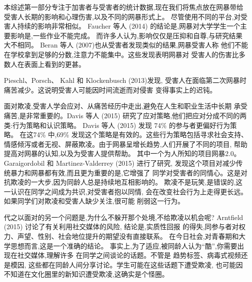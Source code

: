 \documentclass[a4paper]{article}
\begin{document}
本综述第一部分专注于加害者与受害者的统计数据,现在我们将焦点放在网暴带给
受害人长期的影响和心理伤害,以及不同的网暴形式上。
尽管使用不同的平台,对受害人持续的影响非常相似。 Faucher 等人 (2014)
\cite{faucher2014}
的结论是,网暴对大学学生一个主要影响是,一些作业不能完成。
而许多人认为,影响仅仅是压抑和自尊,与研究结果大不相同。
Beran 等人 (2007)\cite{beran2007}也从受害者发现类似的结果,网暴受害人称
他们不能在学校拿到足够的分数,注意力不能集中。这些发现表明网暴对
受害人的伤害比多数人在表面上看到的更甚。

Pieschl、Porsch、 Kahl 和 Klockenbusch (2013)\cite{pieschl2013}发现,
受害人在面临第二次网暴时痛苦减少。这说明受害人可能因时间流逝而对侵害
变得事实上的迟钝。

面对欺凌,受害人学会应对、从痛苦经历中走出,避免在人生和职业生活中长期
承受痛苦,是非常重要的。Davis 等人 (2015)\cite{davis2015}
研究了应对策略,他们把应对分成不同的两类:行为策略和认识策略。
Davis 等人 (2015)\cite{davis2015} 发现 74\% 的参与者更偏好行为策略。
在这74\% 中,69\% 发现这个策略是有效的。这些行为策略包括寻求社会支持、
情感倾泻或者无视、屏蔽欺凌。由于网暴呈增长趋势,人们开展了不同的项目,
帮助提高对网暴的认知,以及为受害人提供帮助。
其中一个为人所知的项目网暴2.0。
Garaigordobil 和 Martinez-Valderrey (2015)\cite{gara2015} 进行了研究,
发现这个项目对减少传统暴力和网暴都有效,而且更为重要的是,它增强了
同学对受害者的同情心。这是对抗欺凌的一大步,因为同龄人总是持续地互相影响的。
欺凌不是玩笑,是错误的,这一认识在同学之间成为共识,对受害者抱以同情,
会在改变社会行为上走得更长远。如果同学们对欺凌和受害人缺少关注,很可能
削弱这一行为。

代之以面对的另一个问题是,为什么不躲开那个处境,不给欺凌以机会呢?
Arntfield (2015)\cite{arntfield2015} 讨论了有关利用社交媒体的风险,
结论是,实质性回报
的得失,同参与者对权力、声望、性别、社会地位提升的期望没有直接联系。
在今日社会,对青春期和大学思想而言,这是一个准确的结论。
事实上,为了适应,被同龄人认为``酷'',你需要出现在社交媒体,理解许多
在同学之间谈论的话题。不管是
趋势标签、病毒式视频还是模因,
这些都在同龄人间分享讨论。学生可能在这些话题下遭受欺凌,
也可能因不知道在文化圈里的新知识遭受欺凌,这确实是个怪圈。
\end{document}

